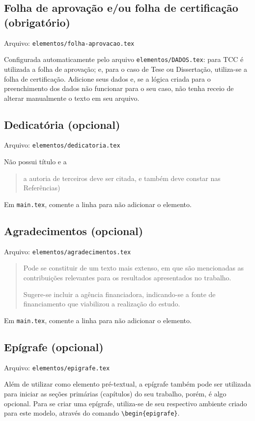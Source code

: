 \subsection{Folha de aprovação e/ou folha de certificação (obrigatório)}
    Arquivo: \texttt{elementos/folha-aprovacao.tex}

    Configurada automaticamente pelo arquivo \texttt{elementos/DADOS.tex}: para TCC é utilizada a folha de aprovação; e, para o caso de Tese ou Dissertação, utiliza-se a folha de certificação. Adicione seus dados e, se a lógica criada para o preenchimento dos dados não funcionar para o seu caso, não tenha receio de alterar manualmente o texto em seu arquivo.
    
\subsection{Dedicatória (opcional)}
    Arquivo: \texttt{elementos/dedicatoria.tex}

    Não possui título e a \blockcquote[p. 32]{livro:iffar-guia-normalizacao-2022}{a autoria de terceiros deve ser citada, e também deve constar nas Referências)}.

    Em \texttt{main.tex}, comente a linha \verb|| para não adicionar o elemento.

\subsection{Agradecimentos (opcional)}
    Arquivo: \texttt{elementos/agradecimentos.tex}

    \blockcquote[p.32]{livro:iffar-guia-normalizacao-2022}{Pode se constituir de um texto mais extenso, em que são mencionadas as contribuições relevantes para os resultados apresentados no trabalho.

    Sugere-se incluir a agência financiadora, indicando-se a fonte de
    financiamento que viabilizou a realização do estudo.}

    Em \texttt{main.tex}, comente a linha \verb|| para não adicionar o elemento.

\subsection{Epígrafe (opcional)}
    Arquivo: \texttt{elementos/epigrafe.tex}

    Além de utilizar como elemento pré-textual, a epígrafe também pode ser utilizada para iniciar as seções primárias (capítulos) do seu trabalho, porém, é algo opcional. Para se criar uma epígrafe, utiliza-se de seu respectivo ambiente criado para este modelo, através do comando \verb|\begin{epigrafe}|.

